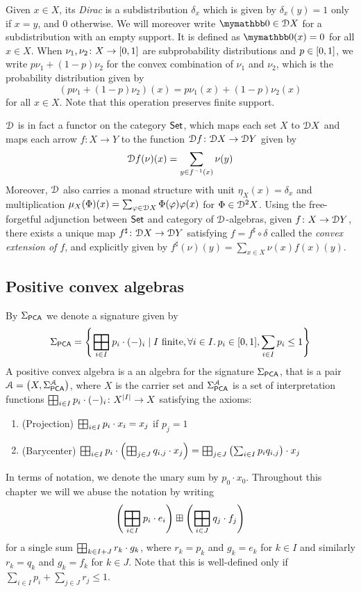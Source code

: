   
 Given $x \in X$, its \emph{Dirac} is a subdistribution $\delta_x$ which is given by $\delta_x(y)=1$ only if $x=y$, and $0$ otherwise. We will moreover write $\emptydist \in \distf X$ for a subdistribution with an empty support. It is defined as $\emptydist(x)=0$ for all $x \in X$. When $\nu_1, \nu_2 \colon X \to \interval{0}{1}$ are subprobability distributions and $p \in \interval{0}{1}$, we write $p\nu_1 + (1-p)\nu_2$ for the convex combination of $\nu_1$ and $\nu_2$, which is the probability distribution given by $$(p \nu_1 + (1-p) \nu_2)(x) = p\nu_1(x) + (1-p)\nu_2(x)$$
 for all $x \in X$. Note that this operation preserves finite support. 
 
  $\mathcal{D}$ is in fact a functor on the category ${\mathsf{Set}}$, which maps each set $X$ to $\mathcal{D} X$ and maps each arrow $f \colon X \to Y$ to the function $\mathcal{D} f \colon \mathcal{D} X \to \mathcal{D} Y$ given by $$\mathcal{D} f (\nu)(x) = \sum_{y \in f^{-1}(x)} \nu(y)$$
   Moreover, $\mathcal{D}$ also  carries a monad structure with unit  $\eta_X(x) = \delta_x$ and multiplication $\mu_X(\Phi)(x) = \sum_{\varphi \in \mathcal{D} X }\Phi(\varphi)\varphi(x)$ for $\Phi \in \mathcal{D}^2 X$. Using the free-forgetful adjunction between ${\mathsf{Set}}$ and category of $\mathcal{D}$-algebras, given $f \colon X \to \mathcal{D} Y$, there exists a unique map $f^\sharp \colon \mathcal{D} X \to \mathcal{D} Y$ satisfying $f = f^\sharp \circ \delta$ called the \emph{convex extension of $f$}, and explicitly given by $f^\sharp(\nu)(y) = \sum_{x \in X} \nu(x) f(x)(y)$.
   
\subsection{Positive convex algebras}\label{c4:subsec:positive}
By $\Sigma_{{\mathsf{PCA}}}$ we denote a signature given by
$$\sigpca = \left\{\bigboxplus_{i \in I} p_i \cdot (-)_i \mid I \text{ finite}, \forall i \in I \ldotp p_i \in [0,1], \sum_{i \in I} p_i \leq 1\right\} $$
A positive convex algebra is a an algebra for the signature $\Sigma_{{\mathsf{PCA}}}$, that is a pair $\mathcal{A} = \left(X, \Sigma_{{\mathsf{PCA}}}^{\mathcal{A}}\right)$, where $X$ is the carrier set and $\Sigma_{{\mathsf{PCA}}}^{\mathcal{A}}$ is a set of interpretation functions $\bigboxplus_{i \in I} p_i \cdot (-)_i \colon X^{|I|} \to X$ satisfying the axioms:
\begin{enumerate}
    \item (Projection) \(\bigboxplus_{i \in I} p_i \cdot x_i = x_j\) if \(p_j=1\)
    \item (Barycenter) \(\bigboxplus_{i \in I} p_i \cdot \left(\bigboxplus_{j \in J}{q_{i,j}} \cdot {x_j}\right) = \bigboxplus_{j \in J} \left(\sum_{i \in I} p_i q_{i,j} \right) \cdot x_j\)
\end{enumerate}
In terms of notation, we denote the unary sum by $p_0 \cdot x_0$. Throughout this chapter we will we abuse the notation by writing $$\left(\bigboxplus_{i \in I} p_i \cdot e_i\right) \boxplus \left(\bigboxplus_{i \in J} q_j \cdot f_j\right)$$ for a single sum $\bigboxplus_{k \in I + J} r_k \cdot g_k$, where $r_k = p_k$ and $g_k = e_k$ for $k \in I$ and similarly $r_k = q_k$ and $g_k = f_k$ for $k \in J$. Note that this is well-defined only if $\sum_{i \in I} p_i + \sum_{j \in J} r_j \leq 1$.

